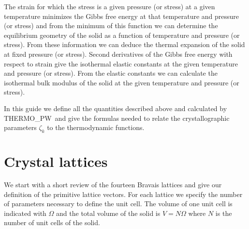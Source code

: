 \documentclass[12pt,a4paper]{article}
\def\tpw{{\sc THERMO\_PW}}
\begin{document}
The strain for which the stress is a given pressure (or stress) at a given
temperature minimizes the Gibbs free energy at that temperature and
pressure (or stress) and from the minimum of this function we can determine 
the equilibrium geometry of the solid as a function of temperature and 
pressure (or stress). 
From these information we can deduce the thermal expansion of the 
solid at fixed pressure (or stress). Second derivatives of the Gibbs free
energy with respect to strain give the isothermal elastic constants at the 
given temperature and pressure (or stress). From the elastic constants 
we can calculate the isothermal bulk modulus of the solid at the
given temperature and pressure (or stress).

In this guide we define all the quantities described above and calculated 
by \tpw\ and give the formulas needed to relate the crystallographic
parameters $\zeta_k$ to the thermodynamic functions.

\newpage

\section{\color{coral}Crystal lattices}
We start with a short review of the fourteen Bravais lattices and give
our definition of the primitive lattice vectors. For each lattice we 
specify the number of parameters necessary to define the unit cell.
The volume of one unit cell is indicated with $\Omega$ and the total 
volume of the solid is $V=N\Omega$ where $N$ is the number of unit cells
of the solid. 
\end{document}
